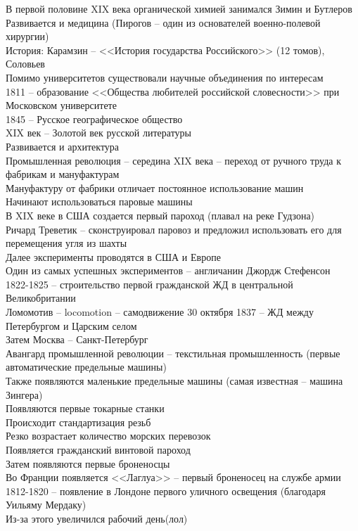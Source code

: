 \documentclass[12pt]{article}
\begin{document}
В первой половине XIX века органической химией занимался Зимин и Бутлеров\\
Развивается и медицина (Пирогов -- один из основателей военно-полевой хирургии)\\
История: Карамзин -- <<История государства Российского>> (12 томов), Соловьев\\
Помимо университетов существовали научные объединения по интересам\\
1811 -- образование <<Общества любителей российской словесности>> при Московском университете\\
1845 -- Русское географическое общество\\
XIX век -- Золотой век русской литературы\\
Развивается и архитектура\\
Промышленная революция -- середина XIX века -- переход от ручного труда к фабрикам и мануфактурам\\
Мануфактуру от фабрики отличает постоянное использование машин\\
Начинают использоваться паровые машины\\
В XIX веке в США создается первый пароход (плавал на реке Гудзона)\\
Ричард Треветик -- сконструировал паровоз и предложил использовать его для перемещения угля из шахты\\
Далее эксперименты проводятся в США и Европе\\
Один из самых успешных экспериментов -- англичанин Джордж Стефенсон\\
1822-1825 -- строительство первой гражданской ЖД в центральной Великобритании\\
Ломомотив -- locomotion -- самодвижение
30 октября 1837 -- ЖД между Петербургом и Царским селом\\
Затем Москва -- Санкт-Петербург\\
Авангард промышленной революции -- текстильная промышленность (первые автоматические предельные машины)\\
Также появляются маленькие предельные машины (самая известная -- машина Зингера)\\
Появляются первые токарные станки\\
Происходит стандартизация резьб\\
Резко возрастает количество морских перевозок\\
Появляется гражданский винтовой пароход\\
Затем появляются первые броненосцы\\
Во Франции появляется <<Лаглуа>> -- первый броненосец на службе армии\\
1812-1820 -- появление в Лондоне первого уличного освещения (благодаря Уильяму Мердаку)\\
Из-за этого увеличился рабочий день(лол)\\
\end{document}
